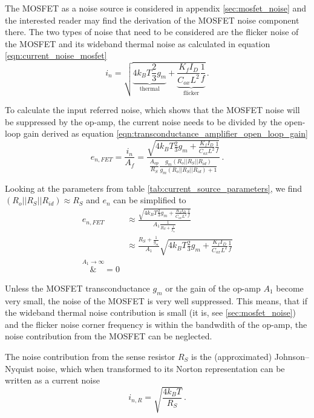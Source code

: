 The MOSFET as a noise source is considered in appendix \ref{sec:mosfet_noise} and the interested reader may find the derivation of the MOSFET noise component there. The two types of noise that need to be considered are the flicker noise of the MOSFET and its wideband thermal noise as calculated in equation \ref{eqn:current_noise_mosfet}
\begin{equation*}
    i_{n} = \sqrt{\underbrace{4 k_B T \frac{2}{3} g_m}_{\text{thermal}} + \underbrace{\frac{K_f I_D}{C_{ox} L^2} \frac{1}{f}}_{\text{flicker}}} \,.
\end{equation*}

To calculate the input referred noise, which shows that the MOSFET noise will be suppressed by the op-amp, the current noise needs to be divided by the open-loop gain derived as equation \ref{eqn:transconductance_amplifier_open_loop_gain}
\begin{equation}
    e_{n,FET} = \frac{i_n}{A_f} = \frac{\sqrt{4 k_B T \frac{2}{3} g_m + \frac{K_f I_D}{C_{ox} L^2} \frac{1}{f}}}{\frac{A_{op}}{R_S} \frac{g_m \left(R_o || R_S || R_{id}\right)}{g_m \left(R_o || R_S || R_{id}\right) + 1}} \,.
\end{equation}

Looking at the parameters from table \ref{tab:current_source_parameters}, we find $\left(R_o || R_S || R_{id}\right) \approx R_S$ and $e_n$ can be simplified to
\begin{align*}
    e_{n,FET} &\approx \frac{\sqrt{4 k_B T \frac{2}{3} g_m + \frac{K_f I_D}{C_{ox} L^2} \frac{1}{f}}}{A_1 \frac{1}{R_S + \frac{1}{g_m}}}\\
    &\approx \frac{R_S + \frac{1}{g_m}}{A_1} \sqrt{4 k_B T \frac{2}{3} g_m + \frac{K_f I_D}{C_{ox} L^2} \frac{1}{f}}\\
    \overset{A_1 \to \infty}&{=} 0
\end{align*}

Unless the MOSFET transconductance $g_m$ or the gain of the op-amp $A_1$ become very small, the noise of the MOSFET is very well suppressed. This means, that if the wideband thermal noise contribution is small (it is, see \ref{sec:mosfet_noise}) and the flicker noise corner frequency is within the bandwdith of the op-amp, the noise contribution from the MOSFET can be neglected.

The noise contribution from the sense resistor $R_S$ is the (approximated) Johnson–Nyquist noise, which when transformed to its Norton representation can be written as a current noise
\begin{equation}
    i_{n,R} = \sqrt{\frac{4 k_B T}{R_S}} \label{eqn:current_noise_resistor}\,.
\end{equation}

